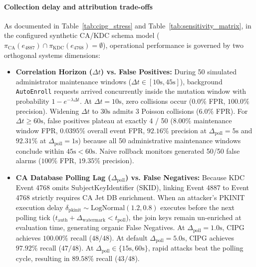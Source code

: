 \paragraph{Collection delay and attribution trade-offs}
As documented in Table~\ref{tab:cipg_stress} and Table~\ref{tab:sensitivity_matrix}, in the configured synthetic CA/KDC schema model ($\pi_{\text{CA}}(e_{4887}) \cap \pi_{\text{KDC}}(e_{4768}) = \emptyset$), operational performance is governed by two orthogonal systems dimensions:
\begin{itemize}
    \item \textbf{Correlation Horizon ($\Delta t$) vs. False Positives:} During 50 simulated administrator maintenance windows ($\Delta t \in [10\text{s}, 45\text{s}]$), background \texttt{AutoEnroll} requests arrived concurrently inside the mutation window with probability $1 - e^{-\lambda \Delta t}$. At $\Delta t = 10\text{s}$, zero collisions occur ($0.0\%$ FPR, $100.0\%$ precision). Widening $\Delta t$ to $30\text{s}$ admits 3 Poisson collisions ($6.0\%$ FPR). For $\Delta t \ge 60\text{s}$, false positives plateau at exactly 4 / 50 ($8.00\%$ maintenance window FPR, $0.0395\%$ overall event FPR, $92.16\%$ precision at $\Delta_{\text{poll}}=5\text{s}$ and $92.31\%$ at $\Delta_{\text{poll}}=1\text{s}$) because all 50 administrative maintenance windows conclude within $45\text{s} < 60\text{s}$. Naive rollback monitors generated 50/50 false alarms ($100\%$ FPR, $19.35\%$ precision).
    \item \textbf{CA Database Polling Lag ($\Delta_{\text{poll}}$) vs. False Negatives:} Because KDC Event 4768 omits SubjectKeyIdentifier (SKID), linking Event 4887 to Event 4768 strictly requires CA Jet DB enrichment. When an attacker's PKINIT execution delay $\delta_{\text{pkinit}} \sim \text{LogNormal}(1.2, 0.8)$ executes before the next polling tick ($t_{\text{auth}} + \Delta_{\text{watermark}} < t_{\text{poll}}$), the join keys remain un-enriched at evaluation time, generating organic False Negatives. At $\Delta_{\text{poll}} = 1.0\text{s}$, CIPG achieves $100.00\%$ recall ($48/48$). At default $\Delta_{\text{poll}} = 5.0\text{s}$, CIPG achieves $97.92\%$ recall ($47/48$). At $\Delta_{\text{poll}} \in \{15\text{s}, 60\text{s}\}$, rapid attacks beat the polling cycle, resulting in $89.58\%$ recall ($43/48$).
\end{itemize}

